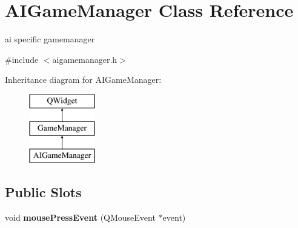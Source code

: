 \hypertarget{class_a_i_game_manager}{\section{A\-I\-Game\-Manager Class Reference}
\label{class_a_i_game_manager}
}


ai specific gamemanager  




{\ttfamily \#include $<$aigamemanager.\-h$>$}

Inheritance diagram for A\-I\-Game\-Manager\-:\begin{figure}[H]
\begin{center}
\leavevmode
\includegraphics[height=3.000000cm]{class_a_i_game_manager}
\end{center}
\end{figure}
\subsection*{Public Slots}
\begin{DoxyCompactItemize}
\item 
\hypertarget{class_a_i_game_manager_a1dd46d003522dfad3572c0de445d1d20}{void {\bfseries mouse\-Press\-Event} (Q\-Mouse\-Event $\ast$event)}\label{class_a_i_game_manager_a1dd46d003522dfad3572c0de445d1d20}

\end{DoxyCompactItemize}
